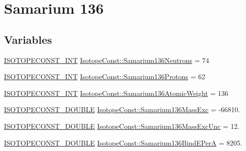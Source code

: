 \hypertarget{group___isotope_const-_samarium-_sm136}{}\section{Samarium 136}
\label{group___isotope_const-_samarium-_sm136}
\subsection*{Variables}
\begin{DoxyCompactItemize}
\item 
\mbox{\hyperlink{group___isotope_const-_macros_ga5f18360b3e99483a35c32d789e62621c}{I\+S\+O\+T\+O\+P\+E\+C\+O\+N\+S\+T\+\_\+\+I\+NT}} \mbox{\hyperlink{group___isotope_const-_samarium-_sm136_gac0788c73519d247a5f0e4c8426dac060}{Isotope\+Const\+::\+Samarium136\+Neutrons}} = 74
\item 
\mbox{\hyperlink{group___isotope_const-_macros_ga5f18360b3e99483a35c32d789e62621c}{I\+S\+O\+T\+O\+P\+E\+C\+O\+N\+S\+T\+\_\+\+I\+NT}} \mbox{\hyperlink{group___isotope_const-_samarium-_sm136_ga51cfc5cdf39c89d69abea759df050281}{Isotope\+Const\+::\+Samarium136\+Protons}} = 62
\item 
\mbox{\hyperlink{group___isotope_const-_macros_ga5f18360b3e99483a35c32d789e62621c}{I\+S\+O\+T\+O\+P\+E\+C\+O\+N\+S\+T\+\_\+\+I\+NT}} \mbox{\hyperlink{group___isotope_const-_samarium-_sm136_ga1b99898729f7b67308f06d3e1830eff3}{Isotope\+Const\+::\+Samarium136\+Atomic\+Weight}} = 136
\item 
\mbox{\hyperlink{group___isotope_const-_macros_ga8f45a7272ce02c0b4c65c44636ed719a}{I\+S\+O\+T\+O\+P\+E\+C\+O\+N\+S\+T\+\_\+\+D\+O\+U\+B\+LE}} \mbox{\hyperlink{group___isotope_const-_samarium-_sm136_ga6e7da69dabb2d2c4f67bdc268581baff}{Isotope\+Const\+::\+Samarium136\+Mass\+Exc}} = -\/66810.
\item 
\mbox{\hyperlink{group___isotope_const-_macros_ga8f45a7272ce02c0b4c65c44636ed719a}{I\+S\+O\+T\+O\+P\+E\+C\+O\+N\+S\+T\+\_\+\+D\+O\+U\+B\+LE}} \mbox{\hyperlink{group___isotope_const-_samarium-_sm136_gaef691157fbeeb8e89a02aadaa1ab5154}{Isotope\+Const\+::\+Samarium136\+Mass\+Exc\+Unc}} = 12.
\item 
\mbox{\hyperlink{group___isotope_const-_macros_ga8f45a7272ce02c0b4c65c44636ed719a}{I\+S\+O\+T\+O\+P\+E\+C\+O\+N\+S\+T\+\_\+\+D\+O\+U\+B\+LE}} \mbox{\hyperlink{group___isotope_const-_samarium-_sm136_ga7c250a05d19349e5df0ee770be379e0b}{Isotope\+Const\+::\+Samarium136\+Bind\+E\+PerA}} = 8205.
\item 

\end{DoxyCompactItemize}

